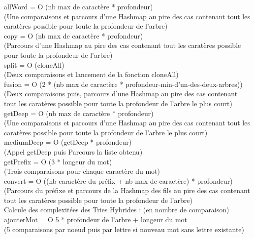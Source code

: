 \documentclass{article}
\begin{document}
allWord = O (nb max de caract\`ere * profondeur)\\
(Une comparaisons et parcours d'une Hashmap au pire des cas contenant tout
les carat\`eres possible pour toute la profondeur de l'arbre)\\

copy = O (nb max de caract\`ere * profondeur)\\
(Parcours d'une Hashmap au pire des cas contenant tout les carat\`eres
possible pour toute la profondeur de l'arbre)\\

split = O (cloneAll)\\
(Deux comparaisons et lancement de la fonction cloneAll)\\

fusion = O (2 * (nb max de caract\`ere * profondeur-min-d'un-des-deux-arbres))
\\
(Deux comparaisons puis, parcours d'une Hashmap au pire des cas contenant
tout les carat\`eres possible pour toute la profondeur de l'arbre le plus court)\\

getDeep = O (nb max de caract\`ere * profondeur)\\
(Une comparaisons et parcours d'une Hashmap au pire des cas contenant tout
les carat\`eres possible pour toute la profondeur de l'arbre le plus court)\\

mediumDeep = O (getDeep * profondeur)\\
(Appel getDeep puis Parcours la liste obtenu)\\

getPrefix = O (3 * longeur du mot)\\
(Trois comparaisons pour chaque caract\`ere du mot)\\

convert = O ((nb caract\`ere du pr\'efix + nb max de caract\`ere) * profondeur)\\
(Parcours du pr\'efixe et parcours de la Hashmap des fils au pire des cas
contenant tout les carat\`eres possible pour toute la profondeur de l'arbre)\\

Calcule des complexit\'ees des Tries Hybrides : (en nombre de comparaison)\\

ajouterMot = O 5 * profondeur de l'arbre + longeur du mot\\
\Rightarrow(5 comparaisons par noeud puis par lettre si nouveau mot sans lettre existante)\\
\end{document}
